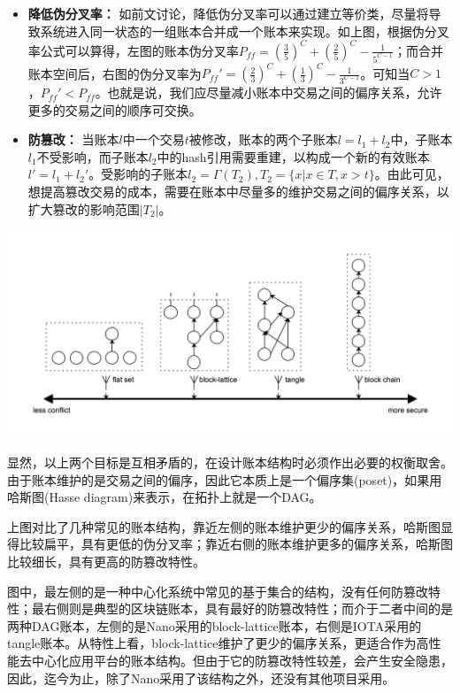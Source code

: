 \documentclass[UTF8,nofonts]{ctexart}
\begin{document}
\begin{multicols}{2}
\begin{itemize}
	\item \textbf{降低伪分叉率：} 如前文讨论，降低伪分叉率可以通过建立等价类，尽量将导致系统进入同一状态的一组账本合并成一个账本来实现。如上图，根据伪分叉率公式可以算得，左图的账本伪分叉率$P_{ff}=\left (  \frac{3}{5} \right )^{C} + \left (  \frac{2}{5} \right )^{C} - \frac{1}{5^{C-1}}$；而合并账本空间后，右图的伪分叉率为${P_{ff}}'=\left (  \frac{2}{3} \right )^{C} + \left (  \frac{1}{3} \right )^{C} - \frac{1}{3^{C-1}}$。可知当$C > 1$，${P_{ff}}' < P_{ff}$。也就是说，我们应尽量减小账本中交易之间的偏序关系，允许更多的交易之间的顺序可交换。
	\item \textbf{防篡改：} 当账本$l$中一个交易$t$被修改，账本的两个子账本$l = l_{1} + l_{2}$中，子账本$l_{1}$不受影响，而子账本$l_{2}$中的hash引用需要重建，以构成一个新的有效账本${l}' = l_{1} + {l_{2}}'$。受影响的子账本$l_{2} = \Gamma(T_{2}),T_{2} = \lbrace x \vert x \in T, x > t \rbrace $。由此可见，想提高篡改交易的成本，需要在账本中尽量多的维护交易之间的偏序关系，以扩大篡改的影响范围$\vert T_{2} \vert$。
\end{itemize}

\includegraphics[width=\linewidth]{image/ledger-compare.png}

显然，以上两个目标是互相矛盾的，在设计账本结构时必须作出必要的权衡取舍。由于账本维护的是交易之间的偏序，因此它本质上是一个偏序集(poset)\cite{poset}，如果用哈斯图(Hasse diagram)\cite{hasse}来表示，在拓扑上就是一个DAG。

上图对比了几种常见的账本结构，靠近左侧的账本维护更少的偏序关系，哈斯图显得比较扁平，具有更低的伪分叉率；靠近右侧的账本维护更多的偏序关系，哈斯图比较细长，具有更高的防篡改特性。

图中，最左侧的是一种中心化系统中常见的基于集合的结构，没有任何防篡改特性；最右侧则是典型的区块链账本，具有最好的防篡改特性；而介于二者中间的是两种DAG账本，左侧的是Nano采用的block-lattice账本\cite{nano}，右侧是IOTA采用的tangle账本\cite{iota}。从特性上看，block-lattice维护了更少的偏序关系，更适合作为高性能去中心化应用平台的账本结构。但由于它的防篡改特性较差，会产生安全隐患，因此，迄今为止，除了Nano采用了该结构之外，还没有其他项目采用。


\end{multicols}
\end{document}
